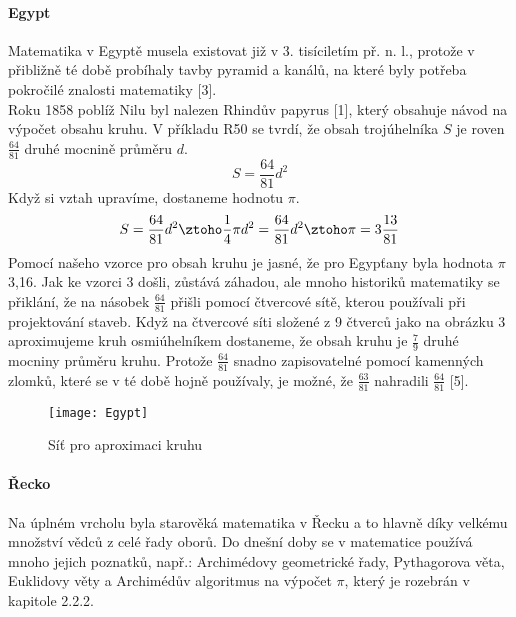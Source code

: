 \documentclass[rocnikovka]{gzwroc} %
\begin{document}
\paragraph{Egypt}
Matematika v Egyptě musela existovat již v 3. tisíciletím př. n. l., protože v přibližně té době probíhaly tavby pyramid a kanálů, na které byly potřeba pokročilé znalosti matematiky [3].\\
Roku 1858 poblíž Nilu byl nalezen Rhindův papyrus [1], který obsahuje návod na výpočet obsahu kruhu. V příkladu R50 se tvrdí, že obsah trojúhelníka $S$ je roven $\frac{64}{81}$ druhé mocnině průměru $d$.
\begin{equation}
S=\frac{64}{81}d^2
\end{equation}
Když si vztah upravíme, dostaneme hodnotu $\pi$.
$$
S=\frac{64}{81}d^2 \ztoho \frac{1}{4}\pi d^2=\frac{64}{81}d^2 \ztoho \pi=3\frac{13}{81}
$$
Pomocí našeho vzorce pro obsah kruhu je jasné, že pro Egypťany byla hodnota $\pi$ 3,16. Jak ke vzorci 3 došli, zůstává záhadou, ale mnoho historiků matematiky se přiklání, že na násobek $\frac{64}{81}$ přišli pomocí čtvercové sítě, kterou používali při projektování staveb. Když na čtvercové síti složené z 9 čtverců jako na obrázku 3 aproximujeme kruh osmiúhelníkem dostaneme, že obsah kruhu je $\frac{7}{9}$ druhé mocniny průměru kruhu. Protože $\frac{64}{81}$ snadno zapisovatelné pomocí kamenných zlomků, které se v té době hojně používaly, je možné, že $\frac{63}{81}$ nahradili $\frac{64}{81}$ [5].
\begin{figure}[!ht]
\texttt{[image: Egypt]}
\caption{Síť pro aproximaci kruhu}
\label{fig:kruh}
\end{figure}
\paragraph{Řecko}
Na úplném vrcholu byla starověká matematika v Řecku a to hlavně díky velkému množství vědců z celé řady oborů. Do dnešní doby se v matematice používá mnoho jejich poznatků, např.: Archimédovy geometrické řady, Pythagorova věta, Euklidovy věty a Archimédův algoritmus na výpočet $\pi$, který je rozebrán v kapitole 2.2.2.
\end{document}
